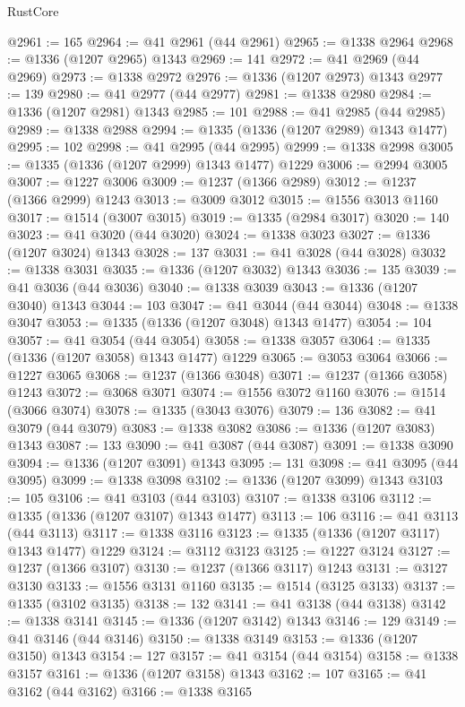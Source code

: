 \begin{lexlean}{RustCore}
\begin{coremodule}
@2961 := 165
@2964 := @41 @2961 (@44 @2961)
@2965 := @1338 @2964
@2968 := @1336 (@1207 @2965) @1343
@2969 := 141
@2972 := @41 @2969 (@44 @2969)
@2973 := @1338 @2972
@2976 := @1336 (@1207 @2973) @1343
@2977 := 139
@2980 := @41 @2977 (@44 @2977)
@2981 := @1338 @2980
@2984 := @1336 (@1207 @2981) @1343
@2985 := 101
@2988 := @41 @2985 (@44 @2985)
@2989 := @1338 @2988
@2994 := @1335 (@1336 (@1207 @2989) @1343 @1477)
@2995 := 102
@2998 := @41 @2995 (@44 @2995)
@2999 := @1338 @2998
@3005 := @1335 (@1336 (@1207 @2999) @1343 @1477) @1229
@3006 := @2994 @3005
@3007 := @1227 @3006
@3009 := @1237 (@1366 @2989)
@3012 := @1237 (@1366 @2999) @1243
@3013 := @3009 @3012
@3015 := @1556 @3013 @1160
@3017 := @1514 (@3007 @3015)
@3019 := @1335 (@2984 @3017)
@3020 := 140
@3023 := @41 @3020 (@44 @3020)
@3024 := @1338 @3023
@3027 := @1336 (@1207 @3024) @1343
@3028 := 137
@3031 := @41 @3028 (@44 @3028)
@3032 := @1338 @3031
@3035 := @1336 (@1207 @3032) @1343
@3036 := 135
@3039 := @41 @3036 (@44 @3036)
@3040 := @1338 @3039
@3043 := @1336 (@1207 @3040) @1343
@3044 := 103
@3047 := @41 @3044 (@44 @3044)
@3048 := @1338 @3047
@3053 := @1335 (@1336 (@1207 @3048) @1343 @1477)
@3054 := 104
@3057 := @41 @3054 (@44 @3054)
@3058 := @1338 @3057
@3064 := @1335 (@1336 (@1207 @3058) @1343 @1477) @1229
@3065 := @3053 @3064
@3066 := @1227 @3065
@3068 := @1237 (@1366 @3048)
@3071 := @1237 (@1366 @3058) @1243
@3072 := @3068 @3071
@3074 := @1556 @3072 @1160
@3076 := @1514 (@3066 @3074)
@3078 := @1335 (@3043 @3076)
@3079 := 136
@3082 := @41 @3079 (@44 @3079)
@3083 := @1338 @3082
@3086 := @1336 (@1207 @3083) @1343
@3087 := 133
@3090 := @41 @3087 (@44 @3087)
@3091 := @1338 @3090
@3094 := @1336 (@1207 @3091) @1343
@3095 := 131
@3098 := @41 @3095 (@44 @3095)
@3099 := @1338 @3098
@3102 := @1336 (@1207 @3099) @1343
@3103 := 105
@3106 := @41 @3103 (@44 @3103)
@3107 := @1338 @3106
@3112 := @1335 (@1336 (@1207 @3107) @1343 @1477)
@3113 := 106
@3116 := @41 @3113 (@44 @3113)
@3117 := @1338 @3116
@3123 := @1335 (@1336 (@1207 @3117) @1343 @1477) @1229
@3124 := @3112 @3123
@3125 := @1227 @3124
@3127 := @1237 (@1366 @3107)
@3130 := @1237 (@1366 @3117) @1243
@3131 := @3127 @3130
@3133 := @1556 @3131 @1160
@3135 := @1514 (@3125 @3133)
@3137 := @1335 (@3102 @3135)
@3138 := 132
@3141 := @41 @3138 (@44 @3138)
@3142 := @1338 @3141
@3145 := @1336 (@1207 @3142) @1343
@3146 := 129
@3149 := @41 @3146 (@44 @3146)
@3150 := @1338 @3149
@3153 := @1336 (@1207 @3150) @1343
@3154 := 127
@3157 := @41 @3154 (@44 @3154)
@3158 := @1338 @3157
@3161 := @1336 (@1207 @3158) @1343
@3162 := 107
@3165 := @41 @3162 (@44 @3162)
@3166 := @1338 @3165

\end{coremodule}
\end{lexlean}
